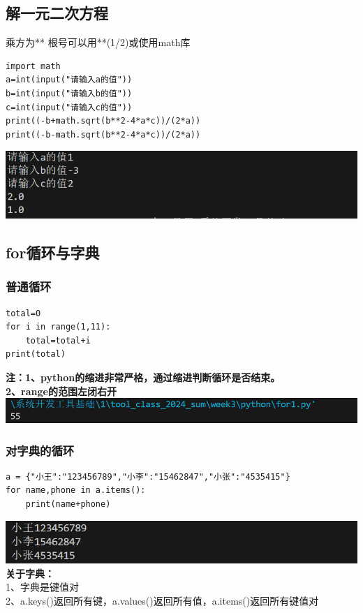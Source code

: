 \documentclass[UTF8,a4paper]{ctexart}
\begin{document}
\subsection{解一元二次方程}
乘方为**  根号可以用**(1/2)或使用math库
\begin{lstlisting}
import math
a=int(input("请输入a的值"))
b=int(input("请输入b的值"))
c=int(input("请输入c的值"))
print((-b+math.sqrt(b**2-4*a*c))/(2*a))
print((-b-math.sqrt(b**2-4*a*c))/(2*a))
\end{lstlisting}
\includegraphics[width=1\textwidth]{./python/math.png}

\subsection{for循环与字典}
\subsubsection{普通循环}
\begin{lstlisting}
total=0
for i in range(1,11):
    total=total+i
print(total)
\end{lstlisting}
\textbf{注：1、python的缩进非常严格，通过缩进判断循环是否结束。}\\
\textbf{2、range的范围左闭右开}\\
\includegraphics[width=1\textwidth]{./python/for1.png}

\subsubsection{对字典的循环}
\begin{lstlisting}
a = {"小王":"123456789","小李":"15462847","小张":"4535415"}
for name,phone in a.items():
    print(name+phone)
\end{lstlisting}
\includegraphics[width=1\textwidth]{./python/for2.png}
\textbf{关于字典：}\\
1、字典是键值对\\
2、a.keys()返回所有键，a.values()返回所有值，a.items()返回所有键值对
\end{document}
